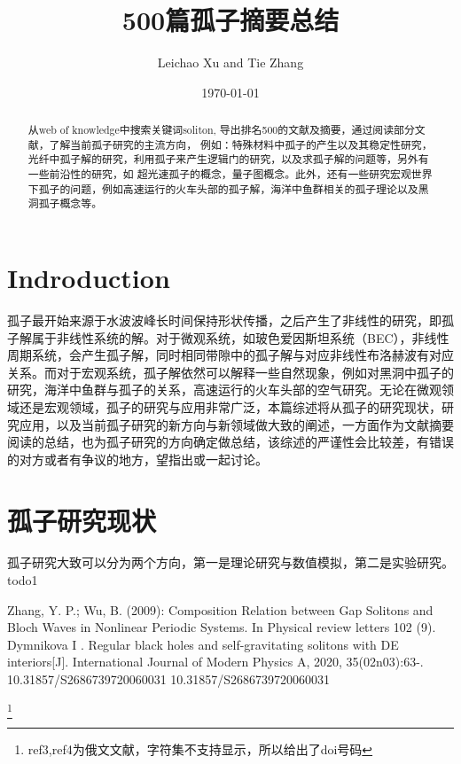 \documentclass{article}
\begin{document}
\title{500篇孤子摘要总结}

\author{Leichao Xu and Tie Zhang}

\date{\today}



\maketitle
\begin{abstract}
从web of knowledge中搜索关键词soliton, 导出排名500的文献及摘要，通过阅读部分文献，了解当前孤子研究的主流方向，
例如：特殊材料中孤子的产生以及其稳定性研究，光纤中孤子解的研究，利用孤子来产生逻辑门的研究，以及求孤子解的问题等，另外有一些前沿性的研究，如
超光速孤子的概念，量子图概念。此外，还有一些研究宏观世界下孤子的问题，例如高速运行的火车头部的孤子解，海洋中鱼群相关的孤子理论以及黑洞孤子概念等。
\end{abstract}
\begin{multicols}{2}
\section{Indroduction}
孤子最开始来源于水波波峰长时间保持形状传播，之后产生了非线性的研究，即孤子解属于非线性系统的解。对于微观系统，如玻色爱因斯坦系统（BEC），非线性周期系统，会产生孤子解，同时相同带隙中的孤子解与对应非线性布洛赫波有对应关系\cite{ref1}。而对于宏观系统，孤子解依然可以解释一些自然现象，例如对黑洞中孤子的研究\cite{ref2}，海洋中鱼群与孤子的关系\cite{ref3}，高速运行的火车头部的空气研究\cite{ref4}。无论在微观领域还是宏观领域，孤子的研究与应用非常广泛，本篇综述将从孤子的研究现状，研究应用，以及当前孤子研究的新方向与新领域做大致的阐述，一方面作为文献摘要阅读的总结，也为孤子研究的方向确定做总结，该综述的严谨性会比较差，有错误的对方或者有争议的地方，望指出或一起讨论。

\section{孤子研究现状}
孤子研究大致可以分为两个方向，第一是理论研究与数值模拟，第二是实验研究。{todo1}
\end{multicols}
\begin{thebibliography}{99}  
Zhang, Y. P.; Wu, B. (2009): Composition Relation between Gap Solitons and Bloch Waves in Nonlinear Periodic Systems. In Physical review letters 102 (9). 
Dymnikova I . Regular black holes and self-gravitating solitons with DE interiors[J]. International Journal of Modern Physics A, 2020, 35(02n03):63-.
10.31857/S2686739720060031
10.31857/S2686739720060031
\end{thebibliography}
\footnote{ref3,ref4为俄文文献，字符集不支持显示，所以给出了doi号码} 
\end{document}
